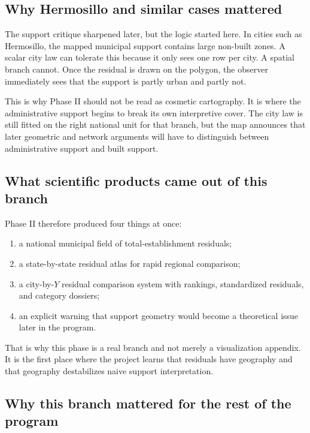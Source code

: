 \documentclass[11pt]{article}
\begin{document}
\subsection{Why Hermosillo and similar cases mattered}

The support critique sharpened later, but the logic started here. In cities such as Hermosillo, the mapped municipal support contains large non-built zones. A scalar city law can tolerate this because it only sees one row per city. A spatial branch cannot. Once the residual is drawn on the polygon, the observer immediately sees that the support is partly urban and partly not.

This is why Phase II should not be read as cosmetic cartography. It is where the administrative support begins to break its own interpretive cover. The city law is still fitted on the right national unit for that branch, but the map announces that later geometric and network arguments will have to distinguish between administrative support and built support.

\subsection{What scientific products came out of this branch}

Phase II therefore produced four things at once:
\begin{enumerate}[label=\arabic*.,leftmargin=2.0em]
\item a national municipal field of total-establishment residuals;
\item a state-by-state residual atlas for rapid regional comparison;
\item a city-by-\(Y\) residual comparison system with rankings, standardized residuals, and category dossiers;
\item an explicit warning that support geometry would become a theoretical issue later in the program.
\end{enumerate}

That is why this phase is a real branch and not merely a visualization appendix. It is the first place where the project learns that residuals have geography and that geography destabilizes naive support interpretation.

\subsection{Why this branch mattered for the rest of the program}
\end{document}
